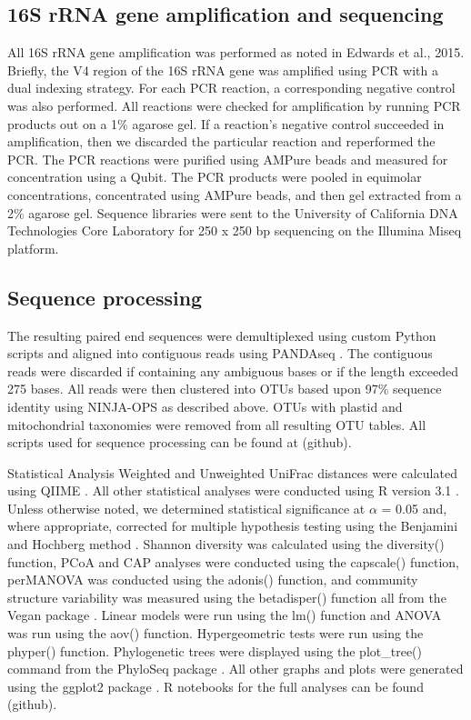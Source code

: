 \subsection{16S rRNA gene amplification and sequencing} 
All 16S rRNA gene amplification was performed as noted in Edwards et al., 2015. Briefly, the V4 region of the 16S rRNA gene was amplified using PCR with a dual indexing strategy. For each PCR reaction, a corresponding negative control was also performed. All reactions were checked for amplification by running PCR products out on a 1\% agarose gel. If a reaction's negative control succeeded in amplification, then we discarded the particular reaction and reperformed the PCR. The PCR reactions were purified using AMPure beads and measured for concentration using a Qubit. The PCR products were pooled in equimolar concentrations, concentrated using AMPure beads, and then gel extracted from a 2\% agarose gel. Sequence libraries were sent to the University of California DNA Technologies Core Laboratory for 250 x 250 bp sequencing on the Illumina Miseq platform. 

\subsection{Sequence processing}
The resulting paired end sequences were demultiplexed using custom Python scripts and aligned into contiguous reads using PANDAseq \cite{Masella2012}. The contiguous reads were discarded if containing any ambiguous bases or if the length exceeded 275 bases. All reads were then clustered into OTUs based upon 97\% sequence identity using NINJA-OPS as described above. OTUs with plastid and mitochondrial taxonomies were removed from all resulting OTU tables. All scripts used for sequence processing can be found at (github).

Statistical Analysis Weighted and Unweighted UniFrac distances were calculated using QIIME \cite{Caporaso2010}. All other statistical analyses were conducted using R version 3.1 \cite{RCoreTeam2016}. Unless otherwise noted, we determined statistical significance at $\alpha$ = 0.05 and, where appropriate, corrected for multiple hypothesis testing using the Benjamini and Hochberg method \cite{Benjamini1995}. Shannon diversity was calculated using the diversity() function, PCoA and CAP analyses were conducted using the capscale() function, perMANOVA was conducted using the adonis() function, and community structure variability was measured using the betadisper() function all from the Vegan package \cite{Oksanen2013}. Linear models were run using the lm() function and ANOVA was run using the aov() function. Hypergeometric tests were run using the phyper() function. Phylogenetic trees were displayed using the plot\_tree() command from the PhyloSeq package \cite{McMurdie2013}. All other graphs and plots were generated using the ggplot2 package \cite{Wickham2009}. R notebooks for the full analyses can be found (github).

